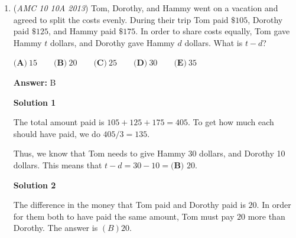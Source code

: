 \begin{enumerate}
 The sum of their opponent's scores is $2 + 1 + 4 + 2 + 6 + 3 + 8 + 4 + 10 + 5 = \boxed{\textbf{(C) }45}$




\textbf{Solution 2 (patterns and easier arithmetic)}

The team must've won the games with the even runs and lost the ones with the odd runs. The opponents will have an arithmetic sequence of runs, $1,2,3,4,5$ when the team has even runs. The opponents will have an arithmetic sequence of even runs, $2,4,6,8,10$, when the team has odd runs. The sum of their runs is $3\cdot(1+2+3+4+5)=3\cdot15=45=\fbox{C}$~dragnin

 



\textbf{Solution 3}

They scored $1+2+3+\dots+10=55$. On the five games where they scored even, their opponents must have scored half of their point so the opponent scored $\frac{2+4+6+8+10}{2}=15$ less than them. On the other games they scored $1$ more so the opponent scored 5 more than them in the odd games. Then the opponent's score is $55-15+5=45$.

 


 


	\item (\textit{AMC 10 10A 2013}) Tom, Dorothy, and Hammy went on a vacation and agreed to split the costs evenly.  During their trip Tom paid $\$105$, Dorothy paid $\$125$, and Hammy paid $\$175$.  In order to share costs equally, Tom gave Hammy $t$ dollars, and Dorothy gave Hammy $d$ dollars.  What is $t-d$?


 $\textbf{(A)}\ 15\qquad\textbf{(B)}\ 20\qquad\textbf{(C)}\ 25\qquad\textbf{(D)}\ 30\qquad\textbf{(E)}\ 35$

 \textbf{Answer: }B



\textbf{Solution 1}

The total amount paid is $105 + 125 + 175 = 405$.  To get how much each should have paid, we do $405/3 = 135$.

 Thus, we know that Tom needs to give Hammy 30 dollars, and Dorothy 10 dollars.  This means that $t-d = 30 - 10 = \boxed{\textbf{(B) }20}$.

 



\textbf{Solution 2}

The difference in the money that Tom paid and Dorothy paid is $20$.  In order for them both to have paid the same amount, Tom must pay $20$ more than Dorothy.  The answer is $\boxed{{(B)20}}$.


\end{enumerate}
